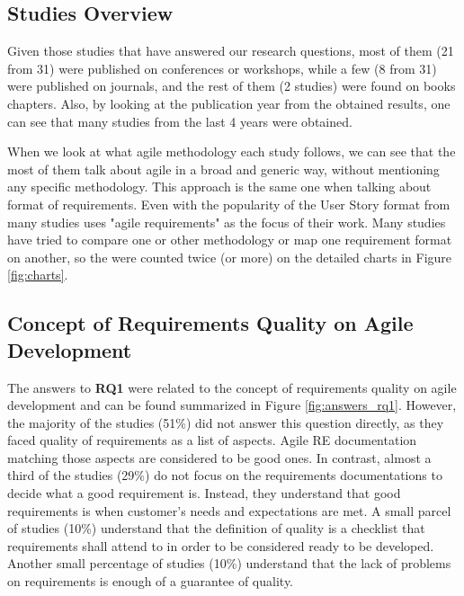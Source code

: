 \subsection{Studies Overview}

Given those studies that have answered our research questions, most of them (21 from 31) were published on conferences or workshops, while a few (8 from 31) were published on journals, and the rest of them (2 studies) were found on books chapters. Also, by looking at the publication year from the obtained results, one can see that many studies from the last 4 years were obtained. 

When we look at what agile methodology each study follows, we can see that the most of them talk about agile in a broad and generic way, without mentioning any specific methodology. This approach is the same one when talking about format of requirements. Even with the popularity of the User Story format from many studies uses "agile requirements" as the focus of their work. Many studies have tried to compare one or other methodology or map one requirement format on another, so the were counted twice (or more) on the detailed charts in Figure \ref{fig:charts}.

\subsection{Concept of Requirements Quality on Agile Development}

The answers to \textbf{RQ1} were related to the concept of requirements quality on agile development and can be found summarized in Figure \ref{fig:answers_rq1}. However, the majority of the studies (51\%) did not answer this question directly, as they faced quality of requirements as a list of aspects. Agile RE documentation matching those aspects are considered to be good ones. In contrast, almost a third of the studies (29\%) do not focus on the requirements documentations to decide what a good requirement is. Instead, they understand that good requirements is when customer's needs and expectations are met. A small parcel of studies (10\%) understand that the definition of quality is a checklist that requirements shall attend to in order to be considered ready to be developed. Another small percentage of studies (10\%) understand that the lack of problems on requirements is enough of a guarantee of quality.

